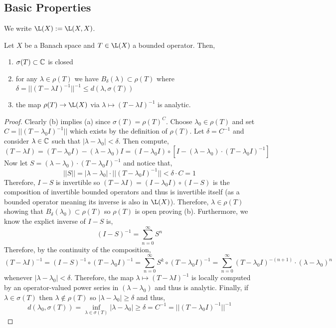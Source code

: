 \documentclass[12pt]{article}
\begin{document}
\subsection{Basic Properties}

\begin{rmk}
We write $\L(X) := \L(X, X)$.
\end{rmk}

\begin{thm}
Let $X$ be a Banach space and $T \in \L(X)$ a bounded operator. Then,
\begin{enumerate}
\item $\sigma(T) \subset \mathbb{C}$ is closed
\item for any $\lambda \in \rho(T)$ we have $B_\delta(\lambda) \subset \rho(T)$ where $\delta = || (T - \lambda I)^{-1} ||^{-1} \le d(\lambda, \sigma(T))$
\item the map $\rho(T) \to \L(X)$ via $\lambda \mapsto (T - \lambda I)^{-1}$ is analytic.
\end{enumerate}
\end{thm}

\begin{proof}
Clearly (b) implies (a) since $\sigma(T) = \rho(T)^C$. Choose $\lambda_0 \in \rho(T)$ and set $C = || (T - \lambda_0 I)^{-1} ||$ which exists by the definition of $\rho(T)$. Let $\delta = C^{-1}$ and consider $\lambda \in \mathbb{C}$ such that $|\lambda - \lambda_0 | < \delta$. Then compute,
\[ (T - \lambda I) = (T - \lambda_0 I) - (\lambda - \lambda_0) I = (I - \lambda_0 I) \circ [ I - (\lambda - \lambda_0) \cdot (T - \lambda_0 I)^{-1} ] \]
Now let $S = (\lambda - \lambda_0) \cdot (T - \lambda_0 I)^{-1}$ and notice that,
\[ || S || = | \lambda - \lambda_0 | \cdot || (T - \lambda_0 I)^{-1} || < \delta \cdot C = 1 \]
Therefore, $I - S$ is invertible so $(T - \lambda I) = (I - \lambda_0 I) \circ (I - S)$ is the composition of invertible bounded operators and thus is invertible itself (as a bounded operator meaning its inverse is also in $\L(X)$). Therefore, $\lambda \in \rho(T)$ showing that $B_\delta(\lambda_0) \subset \rho(T)$ so $\rho(T)$ is open proving (b). Furthermore, we know the explict inverse of $I - S$ is,
\[ (I - S)^{-1} = \sum_{n = 0}^\infty S^n \]
Therefore, by the continuity of the composition,
\[ (T - \lambda I)^{-1} = (I - S)^{-1} \circ (T - \lambda_0 I)^{-1} = \sum_{n = 0}^\infty S^k \circ (T - \lambda_0 I)^{-1} = \sum_{n = 0}^\infty (T - \lambda_0 I)^{-(n+1)} \cdot (\lambda - \lambda_0)^n \]
whenever $| \lambda - \lambda_0 | < \delta$. Therefore, the map $\lambda \mapsto (T - \lambda I)^{-1}$ is locally computed by an operator-valued power series in $(\lambda - \lambda_0)$ and thus is analytic. Finally, if $\lambda \in \sigma(T)$ then $\lambda \notin \rho(T)$ so $| \lambda - \lambda_0 | \ge \delta$ and thus,
\[ d(\lambda_0, \sigma(T)) = \inf_{\lambda \in \sigma(T)} | \lambda - \lambda_0 | \ge \delta = C^{-1} = || (T - \lambda_0 I)^{-1} ||^{-1} \]
\end{proof}
\end{document}

